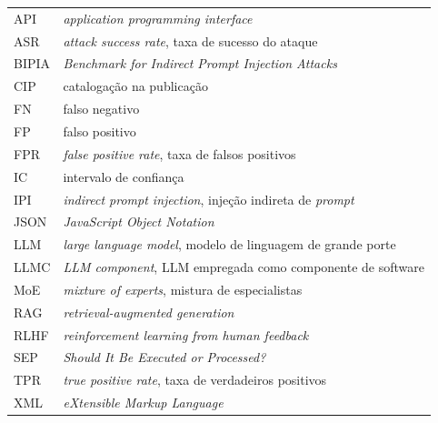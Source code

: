 \begin{longtable}{ll}
API & \textit{application programming interface} \\
ASR & \textit{attack success rate}, taxa de sucesso do ataque \\
BIPIA & \textit{Benchmark for Indirect Prompt Injection Attacks} \\
CIP & catalogação na publicação \\
FN & falso negativo \\
FP & falso positivo \\
FPR & \textit{false positive rate}, taxa de falsos positivos \\
IC & intervalo de confiança \\
IPI & \textit{indirect prompt injection}, injeção indireta de \textit{prompt} \\
JSON & \textit{JavaScript Object Notation} \\
LLM & \textit{large language model}, modelo de linguagem de grande porte \\
LLMC & \textit{LLM component}, LLM empregada como componente de software \\
MoE & \textit{mixture of experts}, mistura de especialistas \\
RAG & \textit{retrieval-augmented generation} \\
RLHF & \textit{reinforcement learning from human feedback} \\
SEP & \textit{Should It Be Executed or Processed?} \\
TPR & \textit{true positive rate}, taxa de verdadeiros positivos \\
XML & \textit{eXtensible Markup Language} \\
\end{longtable}
